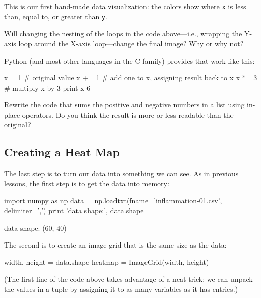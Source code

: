 \documentclass{book}
\begin{document}
This is our first hand-made data visualization: the colors show where
\texttt{x} is less than, equal to, or greater than \texttt{y}.

\begin{challenge}
  Will changing the nesting of the loops in the code above---i.e.,
  wrapping the Y-axis loop around the X-axis loop---change the final
  image? Why or why not?
\end{challenge}

\begin{challenge}
  Python (and most other languages in the C family) provides
   that work like
  this:

\begin{VerbIn}
x = 1  # original value
x += 1 # add one to x, assigning result back to x
x *= 3 # multiply x by 3
print x
6
\end{VerbIn}

  Rewrite the code that sums the positive and negative numbers in a list
  using in-place operators. Do you think the result is more or less
  readable than the original?
\end{challenge}

\subsection{Creating a Heat Map}

The last step is to turn our data into something we can see. As in
previous lessons, the first step is to get the data into memory:

\begin{VerbIn}
import numpy as np
data = np.loadtxt(fname='inflammation-01.csv', delimiter=',')
print 'data shape:', data.shape
\end{VerbIn}

\begin{VerbOut}
data shape: (60, 40)
\end{VerbOut}

The second is to create an image grid that is the same size as the data:

\begin{VerbIn}
width, height = data.shape
heatmap = ImageGrid(width, height)
\end{VerbIn}

(The first line of the code above takes advantage of a neat trick: we
can unpack the values in a tuple by assigning it to as many variables as
it has entries.)
\end{document}
